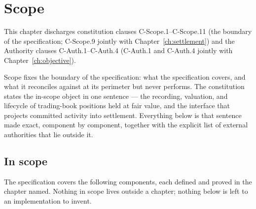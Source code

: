 \section{Scope}\label{ch:scope}

This chapter discharges constitution clauses C-Scope.1--C-Scope.11 (the boundary of the specification; C-Scope.9 jointly with Chapter~\ref{ch:settlement}) and the Authority clauses C-Auth.1--C-Auth.4 (C-Auth.1 and C-Auth.4 jointly with Chapter~\ref{ch:objective}).

Scope fixes the boundary of the specification: what the specification covers, and what it
reconciles against at its perimeter but never performs. The constitution states the
in-scope object in one sentence --- the recording, valuation, and lifecycle of
trading-book positions held at fair value, and the interface that projects committed
activity into settlement. Everything below is that sentence made exact, component by
component, together with the explicit list of external authorities that lie outside it.

\subsection{In scope}

The specification covers the following components, each defined and proved in the chapter
named. Nothing in scope lives outside a chapter; nothing below is left to an implementation
to invent.

